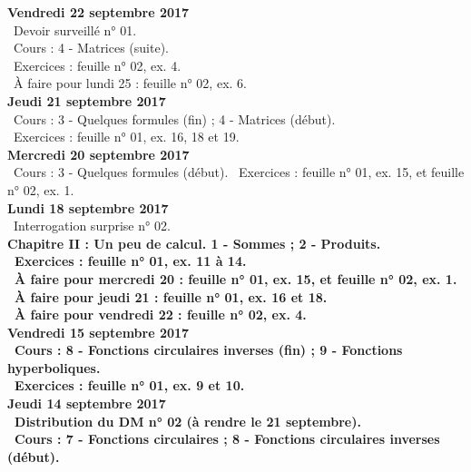 \documentclass[12pt,a4paper]{article}
\begin{document}
\noindent\textbf{Vendredi 22 septembre 2017}\\
\bu\ Devoir surveillé n° 01.\\
\bu\ Cours : 4 - Matrices (suite).\\
\bu\ Exercices : feuille n° 02, ex. 4.\\
\bu\ À faire pour lundi 25 : feuille n° 02, ex. 6.\vspace{.4cm}\\

\noindent\textbf{Jeudi 21 septembre 2017}\\
\bu\ Cours : 3 - Quelques formules (fin) ; 4 - Matrices (début).\\
\bu\ Exercices : feuille n° 01, ex. 16, 18 et 19.\vspace{.4cm}\\

\noindent\textbf{\bf Mercredi 20 septembre 2017}\\
\bu\ Cours : 3 - Quelques formules (début).
\bu\ Exercices : feuille n° 01, ex. 15, et feuille n° 02, ex. 1.\vspace{.4cm}\\

\noindent\textbf{\bf Lundi 18 septembre 2017}\\
\bu\ Interrogation surprise n° 02.\\
\bf Chapitre II \rm : Un peu de calcul. 1 - Sommes ; 2 - Produits.\\
\bu\ Exercices : feuille n° 01, ex. 11 à 14.\\
\bu\ À faire pour mercredi 20 : feuille n° 01, ex. 15, et feuille n° 02, ex. 1.\\
\bu\ À faire pour jeudi 21 : feuille n° 01, ex. 16 et 18.\\
\bu\ À faire pour vendredi 22 : feuille n° 02, ex. 4.\vspace{.4cm}\\

\noindent\textbf{Vendredi 15 septembre 2017}\\
\bu\ Cours : 8 - Fonctions circulaires inverses (fin) ; 9 - Fonctions hyperboliques.\\
\bu\ Exercices : feuille n° 01, ex. 9 et 10.\vspace{.4cm}\\

\noindent\textbf{\bf Jeudi 14 septembre 2017}\\
\bu\ Distribution du DM n° 02 (à rendre le 21 septembre).\\
\bu\ Cours : 7 - Fonctions circulaires ; 8 - Fonctions circulaires inverses (début).\vspace{.4cm}\\
\end{document}
